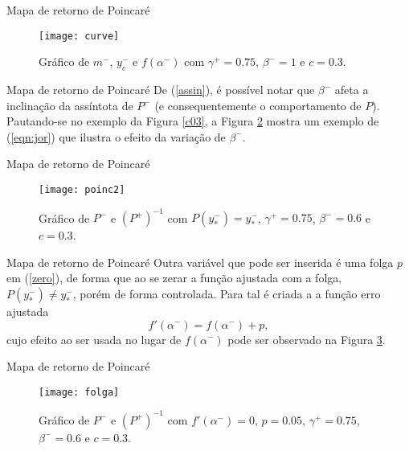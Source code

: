 \documentclass[aspectratio=169]{beamer}
\begin{document}
\begin{frame}{Mapa de retorno de Poincaré}
    \begin{figure}[H]
\centering
\texttt{[image: curve]}\\
\vspace{\baselineskip}
\caption{\label{curve}Gráfico de $m^-$, $y_c^-$ e $f(\alpha^-)$ com $\gamma^+=0.75$, $\beta^-=1$ e $c=0.3$.}
\end{figure}
\end{frame}

\begin{frame}{Mapa de retorno de Poincaré}
    De (\ref{assin}), é possível notar que $\beta^-$ afeta a inclinação da assíntota de $P^-$ (e consequentemente o comportamento de $P$). Pautando-se no exemplo da Figura \ref{c03}, a Figura \ref{beta1} mostra um exemplo de (\ref{eqn:jor}) que ilustra o efeito da variação de $\beta^-$. 
\end{frame}

\begin{frame}{Mapa de retorno de Poincaré}
    \begin{figure}[H]
\centering
\texttt{[image: poinc2]}\\
\vspace{\baselineskip}
\caption{\label{beta1}Gráfico de $P^-$ e $(P^+)^{-1}$ com $P(y^-_*)=y^-_*$, $\gamma^+=0.75$, $\beta^-=0.6$ e $c=0.3$.}
\end{figure}
\end{frame}

\begin{frame}{Mapa de retorno de Poincaré}
    Outra variável que pode ser inserida é uma folga $p$ em (\ref{zero}), de forma que ao se zerar a função ajustada com a folga, $P(y^-_*)\neq y^-_*$, porém de forma controlada. Para tal é criada a a função erro ajustada
\begin{equation}
\label{zero3}
f'\left( \alpha^-\right)=f\left( \alpha^-\right)+p,
\end{equation}
cujo efeito ao ser usada no lugar de $f\left( \alpha^-\right)$ pode ser observado na Figura \ref{folga}.
\end{frame}

\begin{frame}{Mapa de retorno de Poincaré}
    \begin{figure}[H]
\centering
\texttt{[image: folga]}\\
\vspace{\baselineskip}
\caption{\label{folga}Gráfico de $P^-$ e $(P^+)^{-1}$ com $f'\left( \alpha^-\right)=0$, $p=0.05$, $\gamma^+=0.75$, $\beta^-=0.6$ e $ c=0.3$.}
\end{figure}
\end{frame}
\end{document}
